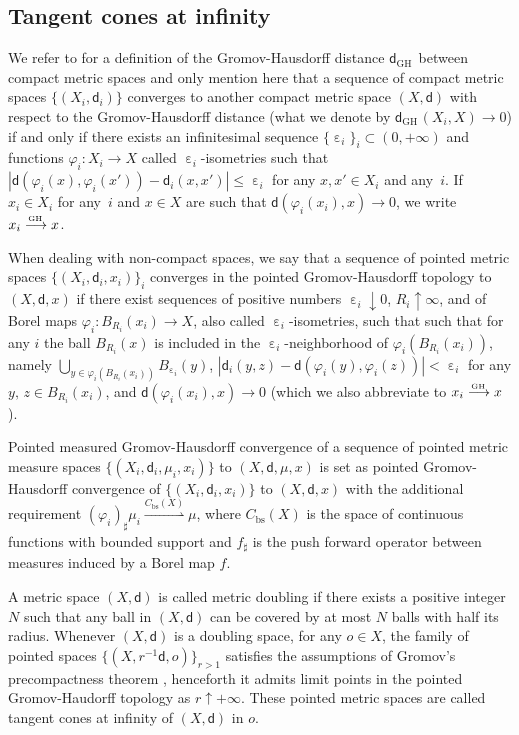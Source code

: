\documentclass[10pt]{amsart}
\def\To#1{\mathchoice{\xrightarrow{\textstyle\kern4pt#1\kern3pt}}{\stackrel{#1}{\longrightarrow}}{}{}}
\newcommand{\sGH}{{\scriptscriptstyle\mathrm{GH}\,}}
\theoremstyle{plain}
\theoremstyle{definition}
\let\eps\upepsilon
\let\phi\varphi
\newcommand{\bs}{\mathrm{bs}}
\newcommand{\dist}{\mathsf{d}}
\begin{document}
\subsection*{Tangent cones at infinity}

We refer to \cite{Gromov} for a definition of the Gromov-Hausdorff distance $\dist_{\sGH}$ between compact metric spaces and only mention here that a sequence of compact metric spaces $\{(X_i,\dist_i)\}$ converges to another compact metric space $(X,\dist)$ with respect to the Gromov-Hausdorff distance (what we denote by $\dist_{\sGH}(X_i,X) \to 0$) if and only if there exists an infinitesimal sequen\-ce $\{\eps_i\}_i \subset (0,+\infty)$ and functions $\phi_i: X_i \to X$ called $\eps_i$-isometries such that \hbox{$|\dist(\phi_i(x),\phi_i(x'))-\dist_i(x,x')|\le \eps_i$} for any $x,x' \in X_i$ and any~$i$. If $x_i \in X_i$ for any~$i$ and $x \in X$ are such that $\dist(\phi_i(x_i),x) \to 0$, we write $x_i \To{\sGH} x$.

When dealing with non-compact spaces, we say that a sequence of pointed metric spaces $\{(X_i, \dist_i, x_i)\}_i$ converges in the pointed Gromov-Hausdorff topology to $(X, \dist, x)$ if there exist sequences of positive numbers $\eps_i \downarrow 0$, $R_i \uparrow \infty$, and of Borel maps $\phi_i:B_{R_i}(x_i) \to X$, also called $\eps_i$-isometries, such that such that for any $i$ the ball $B_{R_i}(x)$ is included in the $\eps_i$-neighborhood of $\phi_i(B_{R_i}(x_i))$, namely $ \bigcup_{y \in \phi_i(B_{R_i}(x_i))} B_{\eps_i}(y)$, $|\dist_i(y, z)-\dist(\phi_i(y), \phi_i(z))|<\eps_i$ for any $y,\, z \in B_{R_i}(x_i)$, and $\dist(\phi_i(x_i),x)\to 0$ (which we also abbreviate to $x_i \To{\sGH} x$).

Pointed measured Gromov-Hausdorff convergence of a sequence of pointed metric measure spaces $\{(X_i, \dist_i, \mu_i, x_i)\}$ to $(X, \dist,\mu,x)$ is set as pointed Gromov-Hausdorff convergence of $\{(X_i, \dist_i, x_i)\}$ to $(X, \dist, x)$ with the additional requirement \hbox{$(\phi_i)_{\sharp}\mu_i \!\stackrel{C_\bs(X)}{\rightharpoonup}\! \mu$}, where $C_\bs(X)$ is the space of continuous functions with bounded support and $ f_\sharp $ is
the push forward operator between measures induced by a Borel map $f$.

A metric space $(X,\dist)$ is called metric doubling if there exists a positive integer $N$ such that any ball in $(X,\dist)$ can be covered by at most $N$ balls with half its radius. Whenever $(X,\dist)$ is a doubling space, for any $o \in X$, the family of pointed spaces $\{(X,r^{-1}\dist,o)\}_{r>1}$ satisfies the assumptions of Gromov's precompactness theorem \cite[Prop.\,5.2]{Gromov}, henceforth it admits limit points in the pointed Gromov-Haudorff topology as $r\uparrow +\infty$. These pointed metric spaces are called tangent cones at infinity of $(X,\dist)$ in $o$.
\end{document}

